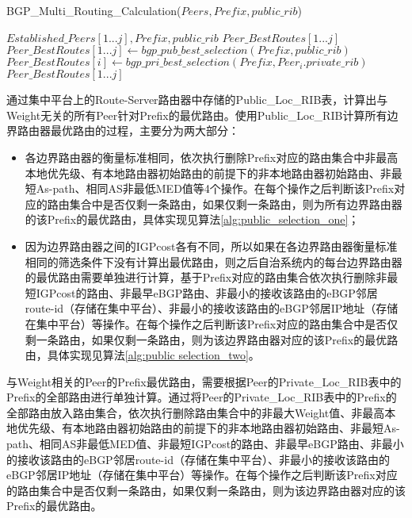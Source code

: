 \begin{algorithm}[htb]
    \caption{BGP\_Multi\_Routing\_Calculation($Peers, Prefix, public\_rib$)}%
    \label{alg:multi_routing_calculation}
    \begin{algorithmic}[1]%
        \REQUIRE
        $Established\_Peers[1...j], Prefix, public\_rib$
        \ENSURE
        $Peer\_BestRoutes[1...j]$
        \STATE $Peer\_BestRoutes[1...j] \gets  bgp\_pub\_best\_selection(Prefix, public\_rib)$
        \STATE $Peer\_BestRoutes[i] \gets  bgp\_pri\_best\_selection(Prefix, Peer_i.private\_rib)$
        \ENDIF
        \ENDFOR
        \RETURN $Peer\_BestRoutes[1...j]$
    \end{algorithmic}
\end{algorithm}

通过集中平台上的Route-Server路由器中存储的Public\_Loc\_RIB表，计算出与Weight无关的所有Peer针对Prefix的最优路由。使用Public\_Loc\_RIB计算所有边界路由器最优路由的过程，主要分为两大部分：
\begin{itemize}
  \item 各边界路由器的衡量标准相同，依次执行删除Prefix对应的路由集合中非最高本地优先级、有本地路由器初始路由的前提下的非本地路由器初始路由、非最短As-path、相同AS非最低MED值等4个操作。在每个操作之后判断该Prefix对应的路由集合中是否仅剩一条路由，如果仅剩一条路由，则为所有边界路由器的该Prefix的最优路由，具体实现见算法\ref{alg:public_selection_one}；
  \item 因为边界路由器之间的IGPcost各有不同，所以如果在各边界路由器衡量标准相同的筛选条件下没有计算出最优路由，则之后自治系统内的每台边界路由器的最优路由需要单独进行计算，基于Prefix对应的路由集合依次执行删除非最短IGPcost的路由、非最早eBGP路由、非最小的接收该路由的eBGP邻居route-id（存储在集中平台）、非最小的接收该路由的eBGP邻居IP地址（存储在集中平台）等操作。在每个操作之后判断该Prefix对应的路由集合中是否仅剩一条路由，如果仅剩一条路由，则为该边界路由器对应的该Prefix的最优路由，具体实现见算法\ref{alg:public selection_two}。\\
\end{itemize}


与Weight相关的Peer的Prefix最优路由，需要根据Peer的Private\_Loc\_RIB表中的Prefix的全部路由进行单独计算。通过将Peer的Private\_Loc\_RIB表中的Prefix的全部路由放入路由集合，依次执行删除路由集合中的非最大Weight值、非最高本地优先级、有本地路由器初始路由的前提下的非本地路由器初始路由、非最短As-path、相同AS非最低MED值、非最短IGPcost的路由、非最早eBGP路由、非最小的接收该路由的eBGP邻居route-id（存储在集中平台）、非最小的接收该路由的eBGP邻居IP地址（存储在集中平台）等操作。在每个操作之后判断该Prefix对应的路由集合中是否仅剩一条路由，如果仅剩一条路由，则为该边界路由器对应的该Prefix的最优路由。

